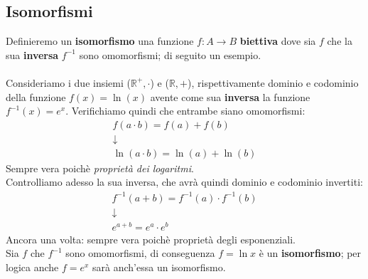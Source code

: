 \subsection{Isomorfismi}
Definieremo un \textbf{isomorfismo} una funzione \(f:A \to B\) 
\textbf{biettiva} dove sia \(f\) che la sua \textbf{inversa}
\(f^{-1}\) sono omomorfismi; di seguito un esempio.
\\
\\
Consideriamo i due insiemi (\( \mathbb{R^+}, \cdot \))
e (\( \mathbb{R}, + \)), rispettivamente dominio e codominio della 
funzione \(f(x) = \ln{(x)}\) avente come sua \textbf{inversa} la funzione
\(f^{-1}(x) = e^x\). Verifichiamo quindi che entrambe siano omomorfismi:
\begin{gather*}
  f(a \cdot b) = f(a) + f(b)
  \\  \downarrow \\
  \ln(a \cdot b) = \ln(a) + \ln(b)
\end{gather*}
Sempre vera poichè \emph{proprietà dei logaritmi}. \\
Controlliamo adesso la sua inversa, che avrà quindi dominio e codominio invertiti:
\begin{gather*}
  f^{-1}(a + b) = f^{-1}(a) \cdot f^{-1}(b)
  \\ \downarrow \\
  e^{a+b} = e^a \cdot e^b
\end{gather*}
Ancora una volta: sempre vera poichè proprietà degli esponenziali.\\
Sia \(f\) che \(f^{-1}\) sono omomorfismi, di conseguenza \(f = \ln x\) è
un \textbf{isomorfismo}; per logica anche \(f = e^x\) sarà anch'essa un 
isomorfismo.